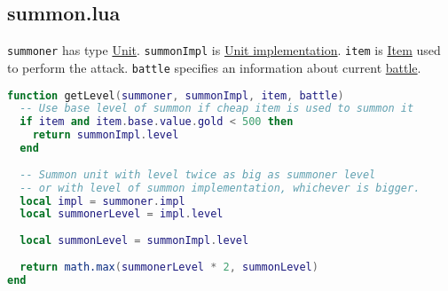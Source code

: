 \subsection{summon.lua}
\texttt{summoner} has type \hyperref[Unit]{Unit}. \texttt{summonImpl} is \hyperref[UnitImpl]{Unit implementation}. \texttt{item} is \hyperref[Item]{Item} used to perform the attack. \texttt{battle} specifies an information about current \hyperref[Battle]{battle}.
\begin{center}
\begin{lstlisting}[language=Lua]
function getLevel(summoner, summonImpl, item, battle)
  -- Use base level of summon if cheap item is used to summon it
  if item and item.base.value.gold < 500 then
    return summonImpl.level
  end
  
  -- Summon unit with level twice as big as summoner level
  -- or with level of summon implementation, whichever is bigger.
  local impl = summoner.impl
  local summonerLevel = impl.level
  
  local summonLevel = summonImpl.level
  
  return math.max(summonerLevel * 2, summonLevel)
end
\end{lstlisting}
\end{center}